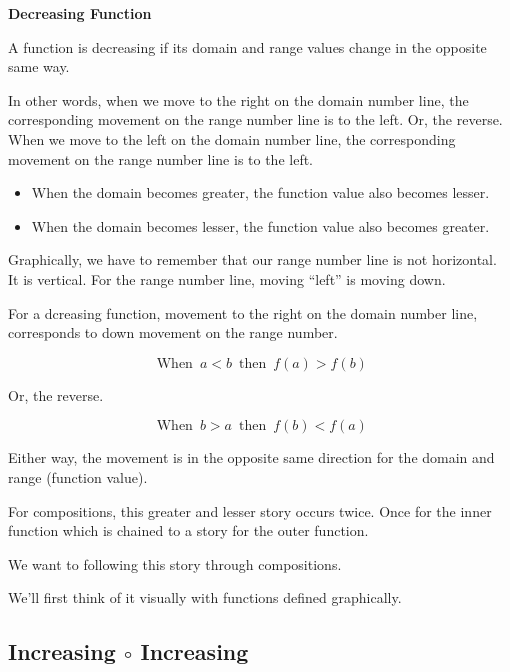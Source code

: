 \documentclass{ximera}
\begin{document}
\begin{template} \textbf{\textcolor{blue!55!black}{Decreasing Function}} 


A function is decreasing if its domain and range values change in the opposite same way. 


In other words, when we move to the right on the domain number line, the corresponding movement on the range number line is to the left. Or, the reverse.  When we move to the left on the domain number line, the corresponding movement on the range number line is to the left.

\begin{itemize}
\item When the domain becomes greater, the function value also becomes lesser.
\item When the domain becomes lesser, the function value also becomes greater.
\end{itemize}

Graphically, we have to remember that our range number line is not horizontal.  It is vertical.  For the range number line, moving ``left'' is moving down.


For a dcreasing function, movement to the right on the domain number line, corresponds to down movement on the range number. 



\[
\text{ When } \,  a < b \, \text{ then } \, f(a) > f(b)
\]


Or, the reverse.


\[
\text{ When } \,  b > a \, \text{ then } \, f(b) < f(a)
\]


Either way, the movement is in the opposite same direction for the domain and range (function value).


\end{template}






For compositions, this greater and lesser story occurs twice. Once for the inner function which is chained to a story for the outer function.



We want to following this story through compositions.   



We'll first think of it visually with functions defined graphically.




\subsection*{Increasing $\circ$ Increasing}
\end{document}
